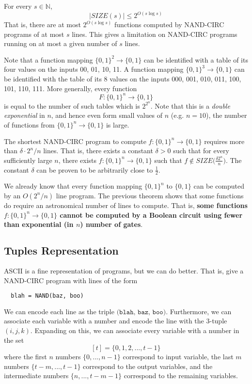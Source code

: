 \documentclass{article}
\begin{document}
  \begin{theorem}
  For every $s \in \mathbb{N}$, 
  \[|SIZE(s)| \leq 2^{O(s \log s)}\]
  That is, there are at most $2^{O (s \log s)}$ functions computed by NAND-CIRC programs of at most $s$ lines. This gives a limitation on NAND-CIRC programs running on at most a given number of $s$ lines. 
  \end{theorem}

  Note that a function mapping $\{0,1\}^2 \longrightarrow \{0, 1\}$ can be identified with a table of its four values on the inputs 00, 01, 10, 11. A function mapping $\{0,1\}^3 \longrightarrow \{0,1\}$ can be identified with the table of its 8 values on the inputs 000, 001, 010, 011, 100, 101, 110, 111. More generally, every function 
  \[F: \{0,1\}^n \longrightarrow \{0,1\}\]
  is equal to the number of such tables which is $2^{2^n}$. Note that this is a \textit{double exponential} in $n$, and hence even form small values of $n$ (e.g. $n = 10$), the number of functions from $\{0,1\}^n \longrightarrow \{0,1\}$ is large. 

  \begin{theorem}
  The shortest NAND-CIRC program to compute $f: \{0,1\}^n \longrightarrow \{0,1\}$ requires more than $\delta \cdot 2^n / n$ lines. That is, there exists a constant $\delta > 0$ such that for every sufficiently large $n$, there exists $f: \{0,1\}^n \longrightarrow \{0,1\}$ such that $f \not\in SIZE\Big( \frac{\delta 2^n}{n}\Big)$. The constant $\delta$ can be proven to be arbitrarily close to $\frac{1}{2}$. 
  \end{theorem}

  We already know that every function mapping $\{0,1\}^n$ to $\{0,1\}$ can be computed by an $O(2^n / n)$ line program. The previous theorem shows that some functions do require an astronomical number of lines to compute. That is, \textbf{some functions $f: \{0,1\}^n \longrightarrow \{0,1\}$ cannot be computed by a Boolean circuit using fewer than exponential (in $n$) number of gates}. 

  \subsection{Tuples Representation}
  ASCII is a fine representation of programs, but we can do better. That is, give a NAND-CIRC program with lines of the form 
  \begin{lstlisting}
  blah = NAND(baz, boo)
  \end{lstlisting}
  We can encode each line as the triple $\texttt{(blah, baz, boo)}$. Furthermore, we can associate each variable with a number and encode the line with the 3-tuple $(i, j, k)$. Expanding on this, we can associate every variable with a number in the set
  \[[t] = \{0, 1, 2, ..., t-1\}\]
  where the first $n$ numbers $\{0, ..., n-1\}$ correspond to input variable, the last $m$ numbers $\{t-m, ..., t-1\}$ correspond to the output variables, and the intermediate numbers $\{n, ..., t-m-1\}$ correspond to the remaining variables. 
\end{document}
